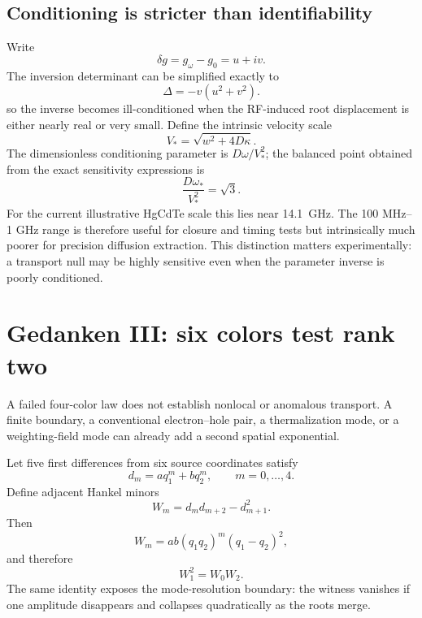 \documentclass[11pt]{article}
\begin{document}
\subsection{Conditioning is stricter than identifiability}
Write
\begin{equation}
\delta g=g_\omega-g_0=u+iv.
\end{equation}
The inversion determinant can be simplified exactly to
\begin{equation}
\boxed{\Delta=-v(u^2+v^2).}
\label{eq:detcond}
\end{equation}
so the inverse becomes ill-conditioned when the RF-induced root displacement is either nearly real or very small. Define the intrinsic velocity scale
\begin{equation}
V_*=\sqrt{w^2+4D\kappa}.
\end{equation}
The dimensionless conditioning parameter is $D\omega/V_*^2$; the balanced point obtained from the exact sensitivity expressions is
\begin{equation}
\boxed{\frac{D\omega_*}{V_*^2}=\sqrt{3}.}
\end{equation}
For the current illustrative HgCdTe scale this lies near \SI{14.1}{GHz}. The 100 MHz--1 GHz range is therefore useful for closure and timing tests but intrinsically much poorer for precision diffusion extraction. This distinction matters experimentally: a transport null may be highly sensitive even when the parameter inverse is poorly conditioned.

\section{Gedanken III: six colors test rank two}
A failed four-color law does not establish nonlocal or anomalous transport. A finite boundary, a conventional electron--hole pair, a thermalization mode, or a weighting-field mode can already add a second spatial exponential.

Let five first differences from six source coordinates satisfy
\begin{equation}
d_m=a q_1^m+b q_2^m,\qquad m=0,\ldots,4.
\end{equation}
Define adjacent Hankel minors
\begin{equation}
W_m=d_m d_{m+2}-d_{m+1}^2.
\end{equation}
Then
\begin{equation}
\boxed{W_m=ab(q_1q_2)^m(q_1-q_2)^2,}
\label{eq:minor}
\end{equation}
and therefore
\begin{equation}
\boxed{W_1^2=W_0W_2.}
\end{equation}
The same identity exposes the mode-resolution boundary: the witness vanishes if one amplitude disappears and collapses quadratically as the roots merge.
\end{document}
